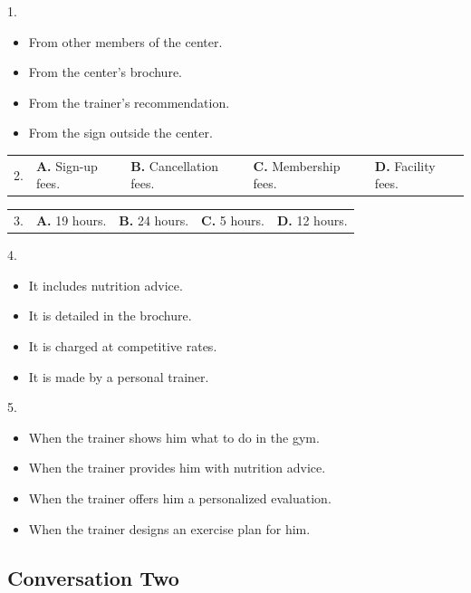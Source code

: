 \documentclass[UTF8,11pt]{ctexart}
\begin{document}
1.


\begin{itemize}[leftmargin=2em,itemsep=.2em,topsep=.4em]\item[A.] From other members of the center.
\item[B.] From the center’s brochure.
\item[C.] From the trainer’s recommendation.
\item[D.] From the sign outside the center.
\end{itemize}

\noindent\begin{tabularx}{\linewidth}{@{}lXXXX@{}}2. & \textbf{A.} Sign-up fees. & \textbf{B.} Cancellation fees. & \textbf{C.} Membership fees. & \textbf{D.} Facility fees.\\\end{tabularx}\par

\noindent\begin{tabularx}{\linewidth}{@{}lXXXX@{}}3. & \textbf{A.} 19 hours. & \textbf{B.} 24 hours. & \textbf{C.} 5 hours. & \textbf{D.} 12 hours.\\\end{tabularx}\par

4.


\begin{itemize}[leftmargin=2em,itemsep=.2em,topsep=.4em]\item[A.] It includes nutrition advice.
\item[B.] It is detailed in the brochure.
\item[C.] It is charged at competitive rates.
\item[D.] It is made by a personal trainer.
\end{itemize}

5.


\begin{itemize}[leftmargin=2em,itemsep=.2em,topsep=.4em]\item[A.] When the trainer shows him what to do in the gym.
\item[B.] When the trainer provides him with nutrition advice.
\item[C.] When the trainer offers him a personalized evaluation.
\item[D.] When the trainer designs an exercise plan for him.
\end{itemize}

\subsection*{\textbf{Conversation Two}}
\end{document}
